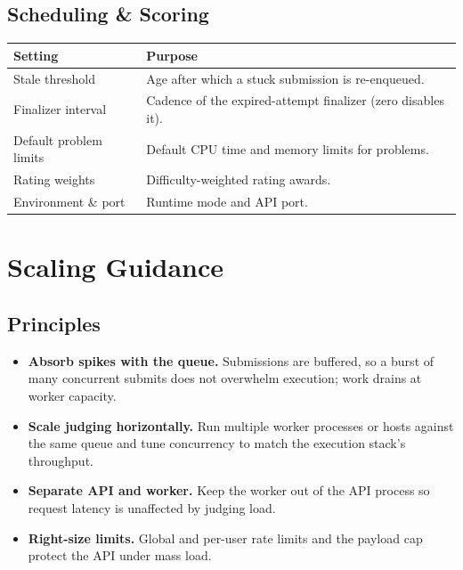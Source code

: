 \documentclass[12pt,a4paper,oneside]{report}
\begin{document}
\section{Scheduling \& Scoring}
\begin{xltabular}{\linewidth}{@{}l X@{}}
\toprule
\textbf{Setting} & \textbf{Purpose}\\
\midrule
\endhead
Stale threshold & Age after which a stuck submission is re-enqueued.\\
Finalizer interval & Cadence of the expired-attempt finalizer (zero disables it).\\
Default problem limits & Default CPU time and memory limits for problems.\\
Rating weights & Difficulty-weighted rating awards.\\
Environment \& port & Runtime mode and API port.\\
\bottomrule
\end{xltabular}

\chapter{Scaling Guidance}
\section{Principles}
\begin{itemize}[leftmargin=1.5em]
  \item \textbf{Absorb spikes with the queue.} Submissions are buffered, so a
        burst of many concurrent submits does not overwhelm execution; work
        drains at worker capacity.
  \item \textbf{Scale judging horizontally.} Run multiple worker processes or
        hosts against the same queue and tune concurrency to match the execution
        stack's throughput.
  \item \textbf{Separate API and worker.} Keep the worker out of the API process
        so request latency is unaffected by judging load.
  \item \textbf{Right-size limits.} Global and per-user rate limits and the
        payload cap protect the API under mass load.
\end{itemize}
\end{document}
